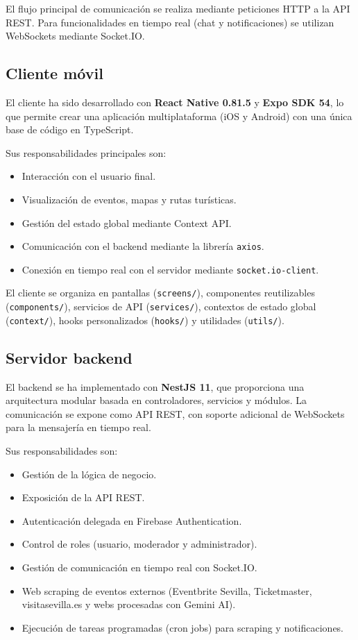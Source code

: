 El flujo principal de comunicación se realiza mediante peticiones HTTP a la API REST. Para funcionalidades en tiempo real (chat y notificaciones) se utilizan WebSockets mediante Socket.IO.

\subsection{Cliente móvil}

El cliente ha sido desarrollado con \textbf{React Native 0.81.5} y \textbf{Expo SDK 54}, lo que permite crear una aplicación multiplataforma (iOS y Android) con una única base de código en TypeScript.

Sus responsabilidades principales son:
\begin{itemize}
    \item Interacción con el usuario final.
    \item Visualización de eventos, mapas y rutas turísticas.
    \item Gestión del estado global mediante Context API.
    \item Comunicación con el backend mediante la librería \texttt{axios}.
    \item Conexión en tiempo real con el servidor mediante \texttt{socket.io-client}.
\end{itemize}

El cliente se organiza en pantallas (\texttt{screens/}), componentes reutilizables (\texttt{components/}), servicios de API (\texttt{services/}), contextos de estado global (\texttt{context/}), hooks personalizados (\texttt{hooks/}) y utilidades (\texttt{utils/}).

\subsection{Servidor backend}

El backend se ha implementado con \textbf{NestJS 11}, que proporciona una arquitectura modular basada en controladores, servicios y módulos. La comunicación se expone como API REST, con soporte adicional de WebSockets para la mensajería en tiempo real.

Sus responsabilidades son:
\begin{itemize}
    \item Gestión de la lógica de negocio.
    \item Exposición de la API REST.
    \item Autenticación delegada en Firebase Authentication.
    \item Control de roles (usuario, moderador y administrador).
    \item Gestión de comunicación en tiempo real con Socket.IO.
    \item Web scraping de eventos externos (Eventbrite Sevilla, Ticketmaster, visitasevilla.es y webs procesadas con Gemini AI).
    \item Ejecución de tareas programadas (cron jobs) para scraping y notificaciones.
\end{itemize}

